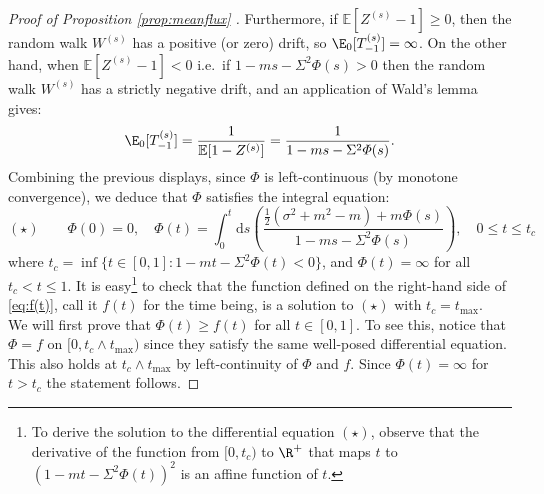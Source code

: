 \begin{proof}[Proof of Proposition \ref{prop:meanflux} ]
Furthermore, if $ \mathbb{E}[Z^{(s)}-1] \geq 0$, then the random walk $W^{(s)}$ has a positive (or zero) drift, so $ \E_0[T_{-1}^{(s)}]= \infty$. On the other hand, when $ \mathbb{E}[Z^{(s)}-1] < 0$ i.e.~if $1-ms -\Sigma^2 \varPhi(s)  > 0$ then the random walk $W^{(s)}$ has a strictly negative drift, and an application of Wald's lemma gives: 
$$\E_0[T^{(s)}_{-1}]=  \frac{1}{ \mathbb{E}[1-Z^{(s)}]}=\frac{1}{1-ms -\Sigma^2 \varPhi(s) }.$$
{Combining the previous displays, since $\varPhi$ is left-continuous (by monotone convergence),  we deduce that  $\varPhi$ satisfies the  integral equation:
$$ (\star)\qquad \varPhi(0) =0, \quad \varPhi(t) = \int_0^t \mathrm{d}s \left(\frac{ \frac{1}{2}(\sigma^2+m^2-m)+ m \varPhi(s)   }{1-ms -\Sigma^2 \varPhi(s)  }\right), \quad 0 \leq t \leq t_c$$ 
where $t_c = \inf\{ t \in [0,1] : 1-mt -\Sigma^2 \varPhi(t)  < 0\}$, and  $ \varPhi(t) = \infty$ for all $ t_{c} < t \leq 1$. It is easy\footnote{To derive the solution to the differential equation $(\star)$, observe that the derivative of the function from $[0,t_c)$ to $\R^+$ that maps $t$ to $(1-mt- \Sigma^2 \varPhi(t))^2$ is an affine function of $t$.}  to check that the function defined on the right-hand side of \eqref{eq:f(t)}, call it $f(t)$ for the time being, is a solution to $(\star)$ with $t_c=t_ \mathrm{max}$.\\
We will first prove that $\varPhi(t) \geq f(t)$ for all $t \in [0,1]$. To see this, notice that $\varPhi = f$ on $[0, t_c \wedge t_ \mathrm{max})$ since they satisfy the same well-posed differential equation. This also holds at $t_c\wedge t_{\max}$ by left-continuity of $\varPhi$ and $f$.  Since $\varPhi(t) = \infty$ for $t>t_{c}$ the statement follows.} 


\end{proof}
